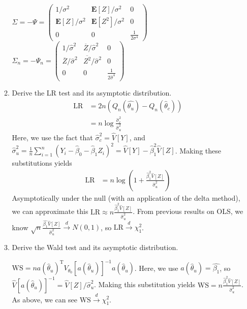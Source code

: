 \documentclass[12pt,english]{article}
\newcommand{\T}{\ensuremath{\text{T}}}
\begin{document}
\begin{enumerate}
\begin{enumerate}
		$\Sigma = -\Psi = \left( \begin{array}{ccc} 1/\sigma^{2} & \mathbf{E}[Z]/\sigma^{2} & 0 \\ \mathbf{E}[Z]/\sigma^{2} & \mathbf{E}[Z^{2}]/\sigma^{2} & 0 \\ 0 & 0 & \frac{1}{2 \sigma^{4}} \end{array} \right) $ \\
		$\Sigma_{n} = -\Psi_{n} = \left( \begin{array}{ccc} 1/\hat{\sigma}^{2} & \overline{Z}/\hat{\sigma}^{2} & 0 \\ \overline{Z}/\hat{\sigma}^{2} & \overline{Z^{2}}/\hat{\sigma}^{2} & 0 \\ 0 & 0 & \frac{1}{2 \hat{\sigma}^{4}} \end{array} \right)$
		\vspace{1em}		
		\item Derive the LR test and its asymptotic distribution.
		\vspace{1em}
		\begin{align*}
		\text{LR} & = 2n (Q_{n}(\hat{\theta_{u}}) - Q_{n}(\hat{\theta}_{c})) \\
		& = n \log \frac{\hat{\sigma}_{c}^{2}}{\hat{\sigma}_{u}^{2}}
		\end{align*}
		Here, we use the fact that $\hat{\sigma}_{c}^{2} = \hat{V}[Y]$, and $\hat{\sigma}_{u}^{2} = \frac{1}{n} \sum_{i=1}^{n} (Y_{i} - \hat{\beta}_{0} - \hat{\beta}_{1} Z_{i})^{2} = \hat{V}[Y] - \hat{\beta}_{1}^{2} \hat{V}[Z]$. Making these substitutions yields
		\begin{align*}
		\text{LR} & = n \log \left( 1 + \frac{\hat{\beta}_{1}^{2} \hat{V}[Z]}{\hat{\sigma}_{u}^{2}} \right)
		\end{align*}
		Asymptotically under the null (with an application of the delta method), we can approximate this $\text{LR} \approx n \frac{\hat{\beta}_{1}^{2}\hat{V}[Z]}{\hat{\sigma}^{2}_{u}}$. From previous results on OLS, we know $\sqrt{n} \frac{\hat{\beta_{1}} \hat{V}[Z]}{\hat{\sigma}^{2}_{u}} \overset{d}{\to} N(0, 1)$, so $\text{LR} \overset{d}{\to} \chi_{1}^{2}$.
		\vspace{1em}
		\item Derive the Wald test and its asymptotic distribution.
		\vspace{1em}
		
		$\text{WS} = n a(\hat{\theta}_{u})^{\T} V_{\theta_{0}}[a(\hat{\theta}_{u})]^{-1} a(\hat{\theta}_{u})$. Here, we use $a(\hat{\theta}_{u}) = \hat{\beta_{1}}$, so $\hat{V}[a(\hat{\theta}_{u})]^{-1} = \hat{V}[Z] / \hat{\sigma}^{2}_{u}$. Making this substitution yields $\text{WS} = n \frac{\hat{\beta}_{1}^{2}\hat{V}[Z]}{\hat{\sigma}^{2}_{u}}$. As above, we can see $\text{WS} \overset{d}{\to} \chi^{2}_{1}$.
		

\end{enumerate}
\end{enumerate}
\end{document}
